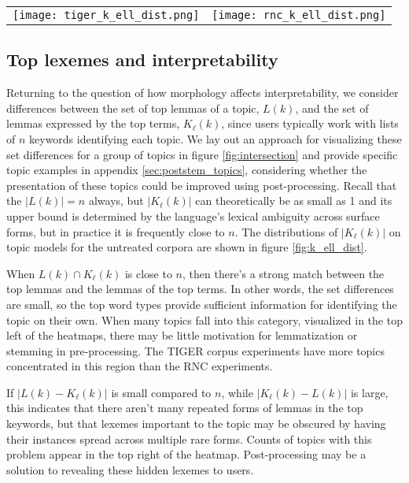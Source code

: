 \documentclass[11pt,a4paper]{article}
\begin{document}
\begin{figure*}[t]
    \label{fig:k_ell_dist}
    \begin{tabular}{ll}
        \texttt{[image: tiger\_k\_ell\_dist.png]} & \texttt{[image: rnc\_k\_ell\_dist.png]}
    \end{tabular}
\end{figure*}


\subsection{Top lexemes and interpretability}
Returning to the question of how morphology affects interpretability, we consider differences between the set of top lemmas of a topic, $L(k)$, and the set of lemmas expressed by the top terms, $K_\ell(k)$, since users typically work with lists of $n$ keywords identifying each topic.
We lay out an approach for visualizing these set differences for a group of topics in figure \ref{fig:intersection} and provide specific topic examples in appendix \ref{sec:poststem_topics}, considering whether the presentation of these topics could be improved using post-processing. Recall that the $|L(k)|=n$ always, but $|K_\ell(k)|$ can theoretically be as small as 1 and its upper bound is determined by the language's lexical ambiguity across surface forms, but in practice it is frequently close to $n$. The distributions of $|K_\ell(k)|$ on topic models for the untreated corpora are shown in figure \ref{fig:k_ell_dist}.

When $L(k) \cap K_\ell(k)$ is close to $n$, then there's a strong match between the top lemmas and the lemmas of the top terms. In other words, the set differences are small, so the top word types provide sufficient information for identifying the topic on their own. When many topics fall into this category, visualized in the top left of the heatmaps, there may be little motivation for lemmatization or stemming in pre-processing. The TIGER corpus experiments have more topics concentrated in this region than the RNC experiments.

If $|L(k)-K_\ell(k)|$ is small compared to $n$, while $|K_\ell(k) - L(k)|$ is large, this indicates that there aren't many repeated forms of lemmas in the top keywords, but that lexemes important to the topic may be obscured by having their instances spread across multiple rare forms. Counts of topics with this problem appear in the top right of the heatmap. Post-processing may be a solution to revealing these hidden lexemes to users.
\end{document}
